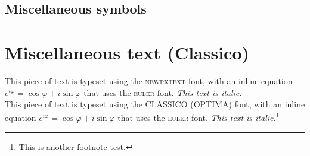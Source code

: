 \documentclass[b5paper,twoside,openright]{scrbook}
\begin{document}
\subsection{Miscellaneous symbols}

\section{Miscellaneous text (Classico)}
This piece of text is typeset using the \textsc{newpxtext} font, with an inline equation $e^{i\varphi} = \cos\varphi + i\sin\varphi$ that uses the \textsc{euler} font. \emph{This text is italic.}\\[1ex]
\textsf{This piece of text is typeset using the CLASSICO (OPTIMA) font, with an inline equation $e^{i\varphi} = \cos\varphi + i\sin\varphi$ that uses the \textsc{euler} font. \textit{This text is italic.}}\footnote{This is another footnote test.}
\end{document}
